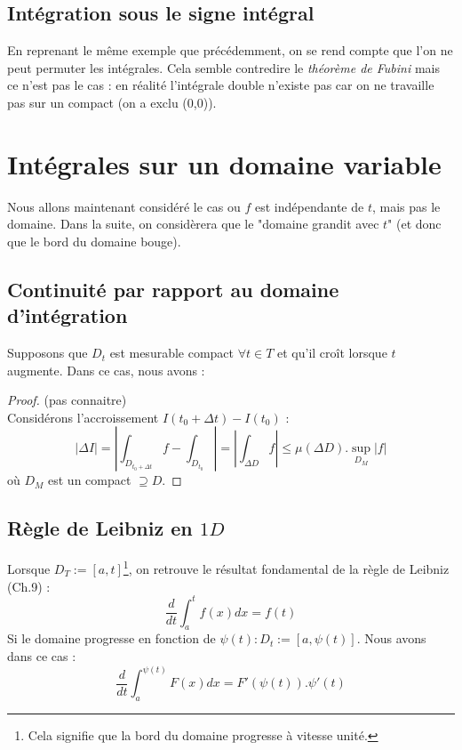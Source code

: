 \documentclass[11pt, a4paper, openany]{book}
\begin{document}
									
		\subsection{Intégration sous le signe intégral}
		En reprenant le même exemple que précédemment, on se rend compte que l'on ne peut permuter les intégrales. Cela semble contredire le \textit{théorème de Fubini} mais ce n'est pas le cas : en réalité l'intégrale double n'existe pas car on ne travaille pas sur un compact (on a exclu (0,0)). 
									
		\section{Intégrales sur un domaine variable}
		Nous allons maintenant considéré le cas ou $f$ est indépendante de $t$, mais pas le domaine. Dans la suite, on considèrera que le "domaine grandit avec $t$" (et donc que le bord du domaine bouge).
									
		\subsection{Continuité par rapport au domaine d'intégration}
		Supposons que $D_t$ est mesurable compact $\forall t \in T$ et qu'il croît lorsque $t$ augmente. Dans ce cas, nous avons :\\
		\begin{proof}(pas connaitre)\\
			Considérons l'accroissement $I(t_0 + \Delta t) - I(t_0)$ :
			$$|\Delta I| = \left|\int_{D_{t_0 + \Delta t}} f - \int_{D_{t_0}}\right| = \left|\int_{\Delta D} f \right| \leq \mu(\Delta D).\sup\limits_{D_M}|f|$$
			où $D_M$ est un compact $\supseteq D$.
		\end{proof}
									
		\subsection{Règle de Leibniz en $1D$}
		Lorsque $D_T := [a,t]$\footnote{Cela signifie que la bord du domaine progresse à vitesse unité.}, on retrouve le résultat fondamental de la règle de Leibniz (Ch.9) :
		\begin{equation}
			\frac{d}{dt}\int_a^t f(x)dx = f(t)
		\end{equation}
		Si le domaine progresse en fonction de $\psi(t) : D_t := [a, \psi(t)]$. Nous avons dans ce cas : 
		\begin{equation}
			\frac{d}{dt}\int_a^{\psi(t)} F(x) dx = F'(\psi(t)).\psi'(t)
		\end{equation}
									
\end{document}

